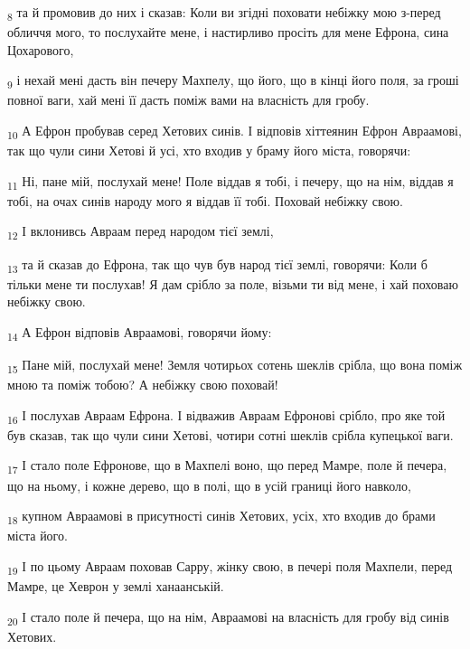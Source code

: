 \begin{tcolorbox}
\textsubscript{8} та й промовив до них і сказав: Коли ви згідні поховати небіжку мою з-перед обличчя мого, то послухайте мене, і настирливо просіть для мене Ефрона, сина Цохарового,
\end{tcolorbox}
\begin{tcolorbox}
\textsubscript{9} і нехай мені дасть він печеру Махпелу, що його, що в кінці його поля, за гроші повної ваги, хай мені її дасть поміж вами на власність для гробу.
\end{tcolorbox}
\begin{tcolorbox}
\textsubscript{10} А Ефрон пробував серед Хетових синів. І відповів хіттеянин Ефрон Авраамові, так що чули сини Хетові й усі, хто входив у браму його міста, говорячи:
\end{tcolorbox}
\begin{tcolorbox}
\textsubscript{11} Ні, пане мій, послухай мене! Поле віддав я тобі, і печеру, що на нім, віддав я тобі, на очах синів народу мого я віддав її тобі. Поховай небіжку свою.
\end{tcolorbox}
\begin{tcolorbox}
\textsubscript{12} І вклонивсь Авраам перед народом тієї землі,
\end{tcolorbox}
\begin{tcolorbox}
\textsubscript{13} та й сказав до Ефрона, так що чув був народ тієї землі, говорячи: Коли б тільки мене ти послухав! Я дам срібло за поле, візьми ти від мене, і хай поховаю небіжку свою.
\end{tcolorbox}
\begin{tcolorbox}
\textsubscript{14} А Ефрон відповів Авраамові, говорячи йому:
\end{tcolorbox}
\begin{tcolorbox}
\textsubscript{15} Пане мій, послухай мене! Земля чотирьох сотень шеклів срібла, що вона поміж мною та поміж тобою? А небіжку свою поховай!
\end{tcolorbox}
\begin{tcolorbox}
\textsubscript{16} І послухав Авраам Ефрона. І відважив Авраам Ефронові срібло, про яке той був сказав, так що чули сини Хетові, чотири сотні шеклів срібла купецької ваги.
\end{tcolorbox}
\begin{tcolorbox}
\textsubscript{17} І стало поле Ефронове, що в Махпелі воно, що перед Мамре, поле й печера, що на ньому, і кожне дерево, що в полі, що в усій границі його навколо,
\end{tcolorbox}
\begin{tcolorbox}
\textsubscript{18} купном Авраамові в присутності синів Хетових, усіх, хто входив до брами міста його.
\end{tcolorbox}
\begin{tcolorbox}
\textsubscript{19} І по цьому Авраам поховав Сарру, жінку свою, в печері поля Махпели, перед Мамре, це Хеврон у землі ханаанській.
\end{tcolorbox}
\begin{tcolorbox}
\textsubscript{20} І стало поле й печера, що на нім, Авраамові на власність для гробу від синів Хетових.
\end{tcolorbox}
